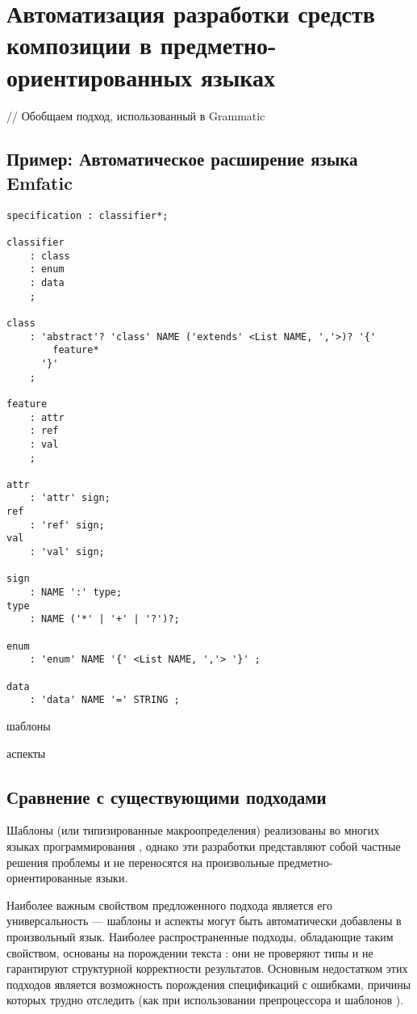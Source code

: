 \part{Автоматизация разработки средств композиции в предметно-ориентированных языках}\label{part4}

// Обобщаем подход, использованный в Grammatic





\chapter{Пример: Автоматическое расширение языка Emfatic}

\begin{lstlisting}
specification : classifier*;

classifier
	: class
	: enum
	: data
	;
	
class
	: 'abstract'? 'class' NAME ('extends' <List NAME, ','>)? '{'
		feature*
	  '}'
	;
	
feature
	: attr
	: ref
	: val
	;
	
attr
	: 'attr' sign;
ref
	: 'ref' sign;
val
	: 'val' sign;
	
sign
	: NAME ':' type;
type
	: NAME ('*' | '+' | '?')?;

enum
	: 'enum' NAME '{' <List NAME, ','> '}' ;
	
data
	: 'data' NAME '=' STRING ;
\end{lstlisting}

шаблоны

аспекты

\chapter{Сравнение с существующими подходами}

Шаблоны (или типизированные макроопределения) реализованы во многих языках программирования \cite{???}, однако эти разработки представляют собой частные решения проблемы и не переносятся на произвольные предметно-ориентированные языки.

Наиболее важным свойством предложенного подхода является его универсальность --- шаблоны и аспекты могут быть автоматически добавлены в произвольный язык. Наиболее распространенные подходы, обладающие таким свойством, основаны на порождении текста \cite{???}: они не проверяют типы и не гарантируют структурной корректности результатов. Основным недостатком этих подходов является возможность порождения спецификаций с ошибками, причины которых трудно отследить (как при использовании препроцессора  и шаблонов ).


